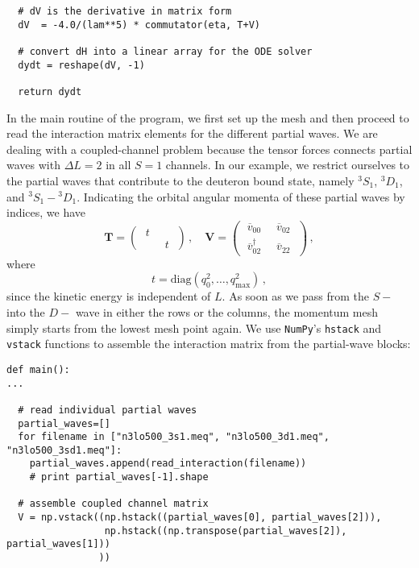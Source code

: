 {\begin{lstlisting}
  # dV is the derivative in matrix form 
  dV  = -4.0/(lam**5) * commutator(eta, T+V)

  # convert dH into a linear array for the ODE solver
  dydt = reshape(dV, -1)
    
  return dydt
\end{lstlisting}

In the main routine of the program, we first set up the mesh and 
then proceed to read the interaction matrix elements for the 
different partial waves.
We are dealing with a coupled-channel problem because
the tensor forces connects partial waves with $\Delta L=2$
in all $S=1$ channels. In our example, we restrict ourselves
to the partial waves that contribute to the deuteron bound
state, namely ${}^3S_1$, ${}^3D_1$,
and ${}^3S_1-{}^3D_1$. Indicating the orbital angular momenta
of these partial waves by indices, we have
\begin{equation}
  \mathbf{T}=
  \begin{pmatrix} 
      \;t\; &   \\
        &  \;t\;
  \end{pmatrix}\,,
  \quad
  \mathbf{V}=
  \begin{pmatrix} 
      \;\overline{v}_{00}\;       &  \;\overline{v}_{02}\; \\
      \;\overline{v}^\dag_{02}\;  &  \;\overline{v}_{22}\;
  \end{pmatrix}\,,
\end{equation}
where 
\begin{equation}
  t = \mathrm{diag}\left(q_0^2,\ldots,q_\text{max}^2\right)\,,
\end{equation}
since the kinetic energy is independent of $L$. As soon as we pass 
from the $S-$ into the $D-$ wave in either the
rows or the columns, the momentum mesh simply starts from the
lowest mesh point again. We use \texttt{NumPy}'s \texttt{hstack} 
and \texttt{vstack} functions to assemble the interaction matrix
from the partial-wave blocks:

\begin{lstlisting}
def main():
...
  
  # read individual partial waves
  partial_waves=[]
  for filename in ["n3lo500_3s1.meq", "n3lo500_3d1.meq", "n3lo500_3sd1.meq"]:
    partial_waves.append(read_interaction(filename))
    # print partial_waves[-1].shape

  # assemble coupled channel matrix
  V = np.vstack((np.hstack((partial_waves[0], partial_waves[2])), 
                 np.hstack((np.transpose(partial_waves[2]), partial_waves[1]))
                ))


\end{lstlisting}}
